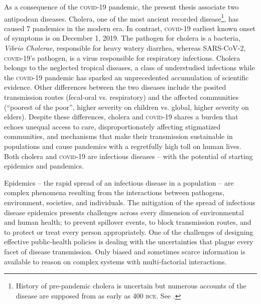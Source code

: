   As a consequence of the \textsc{covid}-19 pandemic, the present thesis associate two antipodean diseases. Cholera, one of the most ancient recorded disease\footnote[][]{History of pre-pandemic cholera is uncertain but numerous accounts of the disease are supposed from as early as 400 \textsc{bce}. See .}, has caused 7 pandemics in the modern era. In contrast, \textsc{covid}-19 earliest known onset of symptoms is on December 1, 2019. The pathogen for cholera is a bacteria, \textit{Vibrio Cholerae}, responsible for heavy watery diarrhea, whereas \textsc{SARS-CoV-2}, \textsc{covid}-19’s pathogen, is a virus responsible for respiratory infections. Cholera belongs to the neglected tropical diseases, a class of understudied infections while the \textsc{covid}-19 pandemic has sparked an unprecedented accumulation of scientific evidence. 
Other differences between the two diseases include the posited transmission routes (fecal-oral vs. respiratory) and the affected communities (``poorest of the poor”, higher severity on children vs. global, higher severity on elders). Despite these differences, cholera and \textsc{covid}-19 shares a burden that echoes unequal access to care, disproportionately affecting stigmatized communities, and mechanisms that make their transmission sustainable in populations and cause pandemics with a regretfully high toll on human lives. Both cholera and \textsc{covid}-19 are infectious diseases -- with the potential of starting epidemics and pandemics.%

 
Epidemics -- the rapid spread of an infectious disease in a population -- are complex phenomena resulting from the interactions between pathogens, environment, societies, and individuals\cite{Rinaldo:RiverNetworksEcological:2020a, Buckee:ThinkingClearlySocial:2021, Heesterbeek:ModelingInfectiousDisease:2015}. The mitigation of the spread of infectious disease epidemics presents challenges across every dimension of environmental and human health; to prevent spillover events, to block transmission routes, and to protect or treat every person appropriately. %
 One of the challenges of designing effective public-health policies is dealing with the uncertainties that plague every facet of disease transmission. Only biased and sometimes scarce information is available to reason on complex systems with multi-factorial interactions. 
 
